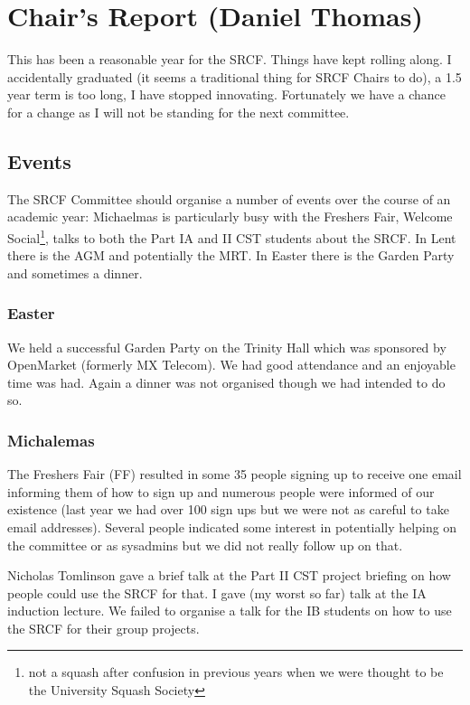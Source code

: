\section{Chair's Report (Daniel Thomas)}

This has been a reasonable year for the SRCF. Things have kept rolling along.
I accidentally graduated (it seems a traditional thing for SRCF Chairs to do), a 1.5 year term is too long, I have stopped innovating.
Fortunately we have a chance for a change as I will not be standing for the next committee.

\subsection{Events}
The SRCF Committee should organise a number of events over the course of an academic year: Michaelmas is particularly busy with the Freshers Fair, Welcome Social\footnote{not a squash after confusion in previous years when we were thought to be the University Squash Society}, talks to both the Part IA and II CST students about the SRCF. In Lent there is the AGM and potentially the MRT. In Easter there is the Garden Party and sometimes a dinner.


\subsubsection{Easter}

We held a successful Garden Party on the Trinity Hall which was sponsored by OpenMarket (formerly MX Telecom). We had good attendance and an enjoyable time was had. Again a dinner was not organised though we had intended to do so.

\subsubsection{Michalemas}
The Freshers Fair (FF) resulted in some 35 people signing up to receive one email informing them of how to sign up and numerous people were informed of our existence (last year we had over 100 sign ups but we were not as careful to take email addresses). Several people indicated some interest in potentially helping on the committee or as sysadmins but we did not really follow up on that.

Nicholas Tomlinson gave a brief talk at the Part II CST project briefing on how people could use the SRCF for that. I gave (my worst so far) talk at the IA induction lecture. We failed to organise a talk for the IB students on how to use the SRCF for their group projects.

